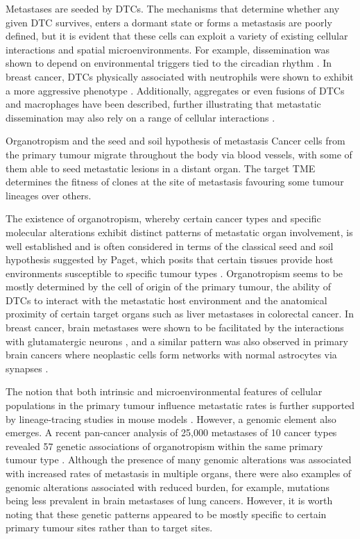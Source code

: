 Metastases are seeded by \acp{DTC}. The mechanisms that determine whether any given \ac{DTC} survives, enters a dormant state or forms a metastasis are poorly defined, but it is evident that these cells can exploit a variety of existing cellular interactions and spatial microenvironments. For example, dissemination was shown to depend on environmental triggers tied to the circadian rhythm \parencite{Diamantopoulou2022-sb}. In breast cancer, \acp{DTC} physically associated with neutrophils were shown to exhibit a more aggressive phenotype \parencite{Szczerba2019-mt}. Additionally, aggregates or even fusions of \acp{DTC} and macrophages have been described, further illustrating that metastatic dissemination may also rely on a range of cellular interactions \parencite{Adams2014-xq}.

    {Organotropism and the seed and soil hypothesis of metastasis \parencite{Seferbekova2023-wg}}
    {Cancer cells from the primary tumour migrate throughout the body via blood vessels, with some of them able to seed metastatic lesions in a distant organ. The target TME determines the fitness of clones at the site of metastasis favouring some tumour lineages over others.}

The existence of organotropism, whereby certain cancer types and specific molecular alterations exhibit distinct patterns of metastatic organ involvement, is well established and is often considered in terms of the classical seed and soil hypothesis suggested by Paget, which posits that certain tissues provide host environments susceptible to specific tumour types \parencite{Fidler2003-lh,Paget1889-ha} . Organotropism seems to be mostly determined by the cell of origin of the primary tumour, the ability of \acp{DTC} to interact with the metastatic host environment and the anatomical proximity of certain target organs such as liver metastases in colorectal cancer. In breast cancer, brain metastases were shown to be facilitated by the interactions with glutamatergic neurons \parencite{Zeng2019-vf}, and a similar pattern was also observed in primary brain cancers where neoplastic cells form networks with normal astrocytes via synapses \parencite{Venkataramani2022-kg}.

The notion that both intrinsic and microenvironmental features of cellular populations in the primary tumour influence metastatic rates is further supported by lineage-tracing studies in mouse models \parencite{Quinn2021-lu}. However, a genomic element also emerges. A recent pan-cancer analysis of 25,000 metastases of 10 cancer types revealed 57 genetic associations of organotropism within the same primary tumour type \parencite{Nguyen2022-jr}. Although the presence of many genomic alterations was associated with increased rates of metastasis in multiple organs, there were also examples of genomic alterations associated with reduced burden, for example,  mutations being less prevalent in brain metastases of lung cancers. However, it is worth noting that these genetic patterns appeared to be mostly specific to certain primary tumour sites rather than to target sites.


